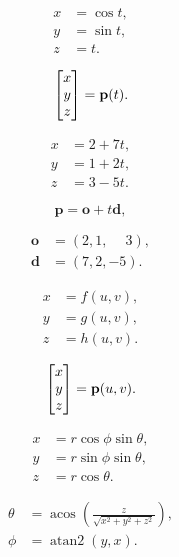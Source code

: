 \documentclass[lang=cn,12pt,marginpar=margintrue]{elegantbook}
\begin{document}
\[
  \begin{aligned}
    x & =\cos t, \\
    y & =\sin t, \\
    z & =t.
  \end{aligned}
\]

\[
  \begin{bmatrix}
    x \\
    y \\
    z
  \end{bmatrix}={\bf p}(t).
\]

\[
  \begin{aligned}
    x & =2+7t, \\
    y & =1+2t, \\
    z & =3-5t.
  \end{aligned}
\]

\[
  \mathbf{p}=\mathbf{o}+t\mathbf{d},
\]

\[
  \begin{aligned}
    \mathbf{o} & =(2,1,\phantom{-}3), \\
    \mathbf{d} & =(7,2,-5).
  \end{aligned}
\]

\[
  \begin{aligned}
    x & =f(u,v), \\
    y & =g(u,v), \\
    z & =h(u,v).
  \end{aligned}
\]

\[
  \begin{bmatrix}
    x \\
    y \\
    z
  \end{bmatrix}={\bf p}(u,v).
\]

\begin{equation}
  \begin{aligned}
    x & =r\cos\phi\sin\theta, \\
    y & =r\sin\phi\sin\theta, \\
    z & =r\cos\theta.
  \end{aligned}
\end{equation}

\begin{equation}
  \begin{aligned}
    \theta & =\operatorname{acos}(\frac{z}{\sqrt{x^{2}+y^{2}+z^{2}}}), \\
    \phi   & =\operatorname{atan2}(y,x).
  \end{aligned}
\end{equation}
\end{document}
